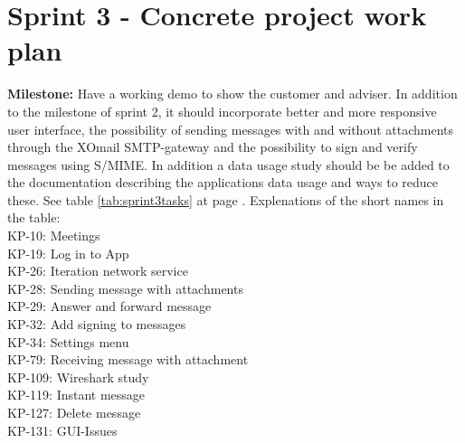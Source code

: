 \section{Sprint 3 - Concrete project work plan}

\textbf{Milestone:} Have a working demo to show the customer and adviser. In addition to the milestone of sprint 2, it should incorporate better and more responsive user interface, the possibility of sending messages with and without attachments through the XOmail SMTP-gateway and the possibility to sign and verify messages using S/MIME. In addition a data usage study should be be added to the documentation describing the applications data usage and ways to reduce these.
\newline
\newline
See table \ref{tab:sprint3tasks} at page \pageref{tab:sprint3tasks}.
\newline
\newline
Explenations of the short names in the table:\\
KP-10: Meetings\\
KP-19: Log in to App\\
KP-26: Iteration network service\\
KP-28: Sending message with attachments\\
KP-29: Answer and forward message\\
KP-32: Add signing to messages\\
KP-34: Settings menu\\
KP-79: Receiving message with attachment\\
KP-109: Wireshark study\\
KP-119: Instant message\\
KP-127: Delete message\\
KP-131: GUI-Issues\\

